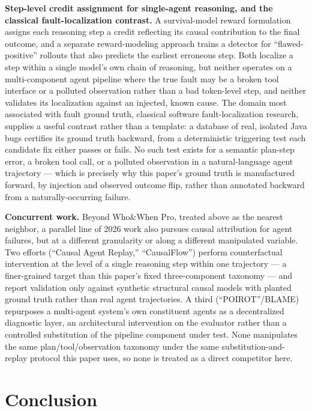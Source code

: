 \documentclass[11pt]{article}
\begin{document}
\textbf{Step-level credit assignment for single-agent reasoning, and the classical fault-localization contrast.} A survival-model reward formulation \citep{CRM2025} assigns each reasoning step a credit reflecting its causal contribution to the final outcome, and a separate reward-modeling approach \citep{FAPO2025} trains a detector for ``flawed-positive'' rollouts that also predicts the earliest erroneous step. Both localize a step within a single model's own chain of reasoning, but neither operates on a multi-component agent pipeline where the true fault may be a broken tool interface or a polluted observation rather than a bad token-level step, and neither validates its localization against an injected, known cause. The domain most associated with fault ground truth, classical software fault-localization research, supplies a useful contrast rather than a template: a database of real, isolated Java bugs \citep{Defects4J2014} certifies its ground truth backward, from a deterministic triggering test each candidate fix either passes or fails. No such test exists for a semantic plan-step error, a broken tool call, or a polluted observation in a natural-language agent trajectory --- which is precisely why this paper's ground truth is manufactured forward, by injection and observed outcome flip, rather than annotated backward from a naturally-occurring failure.

\textbf{Concurrent work.} Beyond Who\&When Pro, treated above as the nearest neighbor, a parallel line of 2026 work also pursues causal attribution for agent failures, but at a different granularity or along a different manipulated variable. Two efforts (``Causal Agent Replay,'' ``CausalFlow'') perform counterfactual intervention at the level of a single reasoning step within one trajectory --- a finer-grained target than this paper's fixed three-component taxonomy --- and report validation only against synthetic structural causal models with planted ground truth rather than real agent trajectories. A third (``POIROT''/BLAME) repurposes a multi-agent system's own constituent agents as a decentralized diagnostic layer, an architectural intervention on the evaluator rather than a controlled substitution of the pipeline component under test. None manipulates the same plan/tool/observation taxonomy under the same substitution-and-replay protocol this paper uses, so none is treated as a direct competitor here.

\section{Conclusion}
\end{document}
